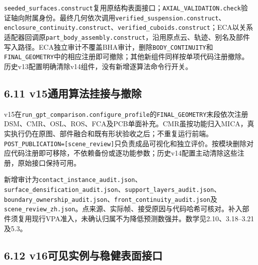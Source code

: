 \documentclass[UTF8,fontset=fandol]{ctexart}
\begin{document}
\texttt{seeded\_\allowbreak{}surfaces.\allowbreak{}construct}复用原结构表面接口；\texttt{AXIAL\_\allowbreak{}VALIDATION.\allowbreak{}check}验证轴向附属身份。最终几何依次调用\texttt{verified\_\allowbreak{}suspension.\allowbreak{}construct}、\texttt{enclosure\_\allowbreak{}continuity.\allowbreak{}construct}、\texttt{verified\_\allowbreak{}cuboids.\allowbreak{}construct}；ECA以关系适配器回调原\texttt{part\_\allowbreak{}body\_\allowbreak{}assembly.\allowbreak{}construct}，沿用原点云、轨迹、别名及部件写入路径。ECA独立审计不覆盖BHA审计，删除\texttt{BODY\_\allowbreak{}CONTINUITY}和\texttt{FINAL\_\allowbreak{}GEOMETRY}中的相应注册即可撤除；其他新组件同样按单项代码注册撤除。历史v13配置明确清除v14组件，没有新增逐算法命令行开关。



\subsection*{6.11 v15通用算法挂接与撤除}

v15在\texttt{run\_\allowbreak{}gpt\_\allowbreak{}comparison.\allowbreak{}configure\_\allowbreak{}profile}的\texttt{FINAL\_\allowbreak{}GEOMETRY}末段依次注册DSM、CMR、OSL、ROS、FCA及PCB单面补充。CMR虽按功能归入MICA，真实执行仍在原图、部件融合和既有形状验收之后；不重复运行前端。\texttt{POST\_\allowbreak{}PUBLICATION=[scene\_\allowbreak{}review]}只负责成品可视化和独立评价。按模块删除对应代码注册即可移除，不依赖备份或逐功能参数；历史v14配置主动清除这些注册，原始接口保持可用。



新增审计为\texttt{contact\_\allowbreak{}instance\_\allowbreak{}audit.\allowbreak{}json}、\texttt{surface\_\allowbreak{}densification\_\allowbreak{}audit.\allowbreak{}json}、\texttt{support\_\allowbreak{}layers\_\allowbreak{}audit.\allowbreak{}json}、\texttt{boundary\_\allowbreak{}ownership\_\allowbreak{}audit.\allowbreak{}json}、\texttt{front\_\allowbreak{}continuity\_\allowbreak{}audit.\allowbreak{}json}及\texttt{scene\_\allowbreak{}review\_\allowbreak{}zh.\allowbreak{}json}。点来源、实际帧、接受原因与代码哈希可核对。补入部件须复用现行VPA准入，未确认归属不为降低预测数强并。数学见2.10、3.18–3.21及5.3。



\subsection*{6.12 v16可见实例与稳健表面接口}
\end{document}
